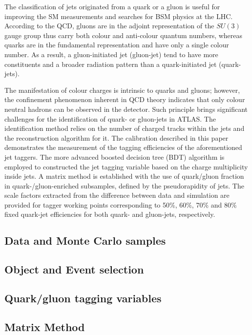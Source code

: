 The classification of jets originated from a quark or a gluon is useful for improving the SM measurements and searches for BSM physics at the LHC.  According to the QCD,  gluons are in the adjoint representation of the $SU(3)$ gauge group thus carry both colour and anti-colour quantum numbers, whereas quarks are in the fundamental representation and have only a single colour number. As a result, a gluon-initiated jet (gluon-jet) tend to have more constituents and a broader radiation pattern than a quark-initiated jet (quark-jets). 

The manifestation of colour charges is intrinsic to quarks and gluons; however, the confinement phenomenon inherent in QCD theory indicates that only colour neutral hadrons can be observed in the detector. Such principle brings significant challenges for the identification of quark- or gluon-jets in ATLAS. The identification method relies on the number of charged tracks within the jets and the reconstruction algorithm for it. The calibration described in this paper demonstrates the measurement of the tagging efficiencies of the aforementioned jet taggers. The more advanced boosted decision tree (BDT) algorithm is employed to constructed the jet tagging variable based on the charge multiplicity inside jets. A matrix method is established with the use of quark/gluon fraction in quark-/gluon-enriched subsamples, defined by the pseudorapidity of jets. The scale factors extracted from the difference between data and simulation are provided for tagger working points corresponding to 50\%, 60\%, 70\% and 80\% fixed quark-jet efficiencies for both quark- and gluon-jets, respectively.
  

\subsection{Data and Monte Carlo samples}
\label{sec:Data-MC}


\subsection{Object and Event selection}
\label{sec:Obj-event}


\subsection{Quark/gluon tagging variables}
\label{sec:QG-var}


\subsection{Matrix Method}
\label{sec:QG-method}



